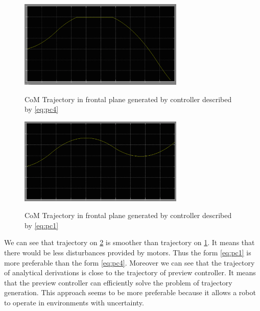 \documentclass[12pt,a4paper]{report}
\begin{document}
	 	\begin{figure}[h!]
	 		\vspace{-0.2cm}
	 		\centering
	 		{\includegraphics[width=0.7\textwidth]{22}}
	 		\caption{CoM  Trajectory in frontal plane generated by controller described by \ref{eq:pc4}}
	 		\label{fig:22}
	 		\vspace{-0.1cm}
	 	\end{figure}
	 	\begin{figure}[h!]
	 		\vspace{-0.2cm}
	 		\centering
	 		{\includegraphics[width=0.7\textwidth]{23}}
	 		\caption{CoM  Trajectory in frontal plane generated by controller described by \ref{eq:pc1}}
	 		\label{fig:23}
	 		\vspace{-0.1cm}
	 	\end{figure}
	 	
	 	We can see that trajectory on \cref{fig:23} is smoother than trajectory on \cref{fig:22}. It means that there would be less disturbances provided by motors. Thus the form \ref{eq:pc1} is more preferable than the form \ref{eq:pc4}.
	 	Moreover we can see that the trajectory of analytical derivations is close to the trajectory of preview controller. It means that the preview controller can efficiently solve the problem of trajectory generation. This approach seems to be more preferable because it allows a robot to operate in environments with uncertainty.
\end{document}
